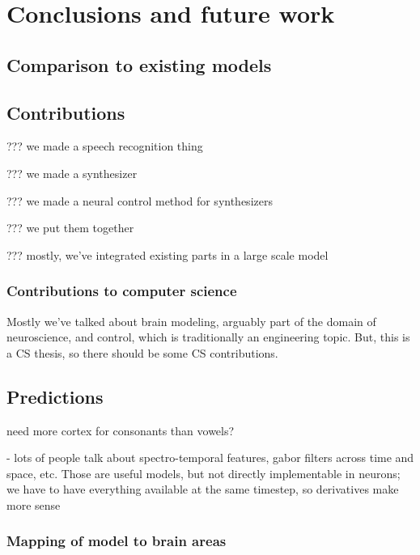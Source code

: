 \chapter{Conclusions and future work}



\section{Comparison to existing models}

\section{Contributions}

??? we made a speech recognition thing

??? we made a synthesizer

??? we made a neural control method for synthesizers

??? we put them together

??? mostly, we've integrated existing parts in a large scale model

\subsection{Contributions to computer science}

Mostly we've talked about brain modeling,
arguably part of the domain of neuroscience,
and control, which is traditionally an engineering topic.
But, this is a CS thesis, so there should be some CS contributions.

\section{Predictions}

need more cortex for consonants than vowels?

- lots of people talk about spectro-temporal features,
  gabor filters across time and space, etc.
  Those are useful models, but not directly implementable
  in neurons; we have to have everything available at
  the same timestep, so derivatives make more sense

\subsection{Mapping of model to brain areas}

